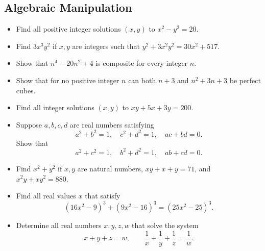 \documentclass[12pt]{article}
\begin{document}
\subsection{Algebraic Manipulation}
\begin{itemize}
  \item Find all positive integer solutions $(x, y)$ to $x^2 - y^2 = 20$.

  \item Find $3x^3y^2$ if $x, y$ are integers such that $y^2 + 3x^2y^2 = 30x^2 + 517$.

  \item Show that $n^4 - 20n^2 + 4$ is composite for every integer $n$.

  \item Show that for no positive integer $n$ can both $n+3$ and $n^2+3n+3$ be perfect cubes.

  \item Find all integer solutions $(x, y)$ to $xy + 5x + 3y = 200$.

  \item Suppose $a, b, c, d$ are real numbers satisfying
  \[
  a^2 + b^2 = 1, \quad c^2 + d^2 = 1, \quad ac + bd = 0.
  \]
  Show that
  \[
  a^2 + c^2 = 1, \quad b^2 + d^2 = 1, \quad ab + cd = 0.
  \]

  \item Find $x^2 + y^2$ if $x, y$ are natural numbers, $xy + x + y = 71$, and $x^2y + xy^2 = 880$.

  \item Find all real values $x$ that satisfy
  \[
  (16x^2 - 9)^3 + (9x^2 - 16)^3 = (25x^2 - 25)^3.
  \]

  \item  Determine all real numbers $x, y, z, w$ that solve the system
  \[
  x + y + z = w, \qquad \frac{1}{x} + \frac{1}{y} + \frac{1}{z} = \frac{1}{w}.
  \]
\end{itemize}
\end{document}
